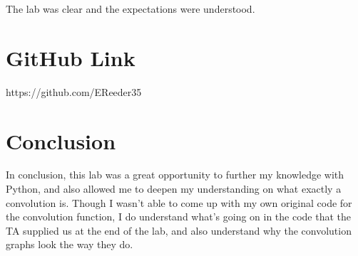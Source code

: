 \documentclass[12pt]{article}
\begin{document}
The lab was clear and the expectations were understood.

\section{GitHub Link}

https://github.com/EReeder35

\section{Conclusion}

In conclusion, this lab was a great opportunity to further my knowledge with Python, and also allowed me to deepen my understanding on what exactly a convolution is. Though I wasn't able to come up with my own original code for the convolution function, I do understand what's going on in the code that the TA supplied us at the end of the lab, and also understand why the convolution graphs look the way they do.
\end{document}
